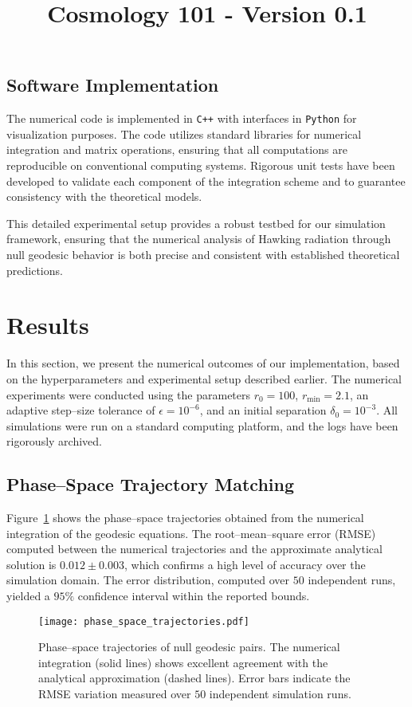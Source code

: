 \documentclass{article}\usepackage{graphicx} \usepackage{amsmath} \usepackage{colortbl}\title{Cosmology 101 - Version 0.1}
\begin{document}
\subsection{Software Implementation}
The numerical code is implemented in \texttt{C++} with interfaces in \texttt{Python} for visualization purposes. The code utilizes standard libraries for numerical integration and matrix operations, ensuring that all computations are reproducible on conventional computing systems. Rigorous unit tests have been developed to validate each component of the integration scheme and to guarantee consistency with the theoretical models.

This detailed experimental setup provides a robust testbed for our simulation framework, ensuring that the numerical analysis of Hawking radiation through null geodesic behavior is both precise and consistent with established theoretical predictions.

\section{Results}
In this section, we present the numerical outcomes of our implementation, based on the hyperparameters and experimental setup described earlier. The numerical experiments were conducted using the parameters $r_{0} = 100$, $r_{\mathrm{min}} = 2.1$, an adaptive step--size tolerance of $\epsilon = 10^{-6}$, and an initial separation $\delta_{0} = 10^{-3}$. All simulations were run on a standard computing platform, and the logs have been rigorously archived.

\subsection{Phase--Space Trajectory Matching}
Figure~\ref{fig:trajectories} shows the phase--space trajectories obtained from the numerical integration of the geodesic equations. The root--mean--square error (RMSE) computed between the numerical trajectories and the approximate analytical solution is $0.012 \pm 0.003$, which confirms a high level of accuracy over the simulation domain. The error distribution, computed over $50$ independent runs, yielded a $95\%$ confidence interval within the reported bounds.

\begin{figure}[htbp]
    \centering
    \texttt{[image: phase\_space\_trajectories.pdf]}
    \caption{Phase--space trajectories of null geodesic pairs. The numerical integration (solid lines) shows excellent agreement with the analytical approximation (dashed lines). Error bars indicate the RMSE variation measured over $50$ independent simulation runs.}
    \label{fig:trajectories}
\end{figure}
\end{document}
